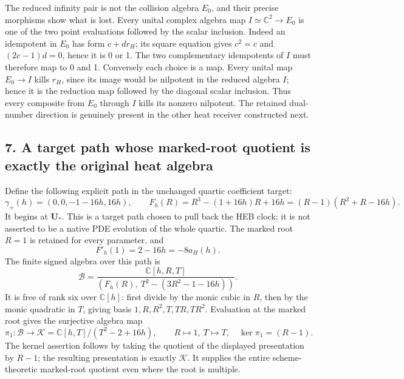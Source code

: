 \documentclass[
  10pt,
  a4paper,
]{article}
\begin{document}
The reduced infinity pair is not the collision algebra \(E_0\), and
their precise morphisms show what is lost. Every unital complex algebra
map \(I\simeq\mathbb C^2\to E_0\) is one of the two point evaluations
followed by the scalar inclusion. Indeed an idempotent in \(E_0\) has
form \(c+dr_H\); its square equation gives \(c^2=c\) and \((2c-1)d=0\),
hence it is 0 or 1. The two complementary idempotents of \(I\) must
therefore map to 0 and 1. Conversely each choice is a map. Every unital
map \(E_0\to I\) kills \(r_H\), since its image would be nilpotent in
the reduced algebra \(I\); hence it is the reduction map followed by the
diagonal scalar inclusion. Thus every composite from \(E_0\) through
\(I\) kills its nonzero nilpotent. The retained dual-number direction is
genuinely present in the other heat receiver constructed next.

\subsection{7. A target path whose marked-root quotient is exactly the
original heat
algebra}\label{a-target-path-whose-marked-root-quotient-is-exactly-the-original-heat-algebra}

Define the following explicit path in the unchanged quartic coefficient
target: \[
\gamma_+(h)=(0,0,-1-16h,16h),\qquad
F_h(R)=R^3-(1+16h)R+16h
=(R-1)(R^2+R-16h).
\tag{ESH35}
\] It begins at \(\mathbf U_*\). This is a target path chosen to pull
back the HEB clock; it is not asserted to be a native PDE evolution of
the whole quartic. The marked root \(R=1\) is retained for every
parameter, and \[
F'_h(1)=2-16h=-8a_H(h).
\tag{ESH36}
\] The finite signed algebra over this path is \[
\mathcal B=
\frac{\mathbb C[h,R,T]}{(F_h(R),\ T^2-(3R^2-1-16h))}.
\tag{ESH37}
\] It is free of rank six over \(\mathbb C[h]\): first divide by the
monic cubic in \(R\), then by the monic quadratic in \(T\), giving basis
\(1,R,R^2,T,TR,TR^2\). Evaluation at the marked root gives the
surjective algebra map \[
\pi_1:\mathcal B\longrightarrow
\mathcal K=\mathbb C[h,T]/(T^2-2+16h),
\qquad R\longmapsto1,\ T\longmapsto T,
\quad\ker\pi_1=(R-1).
\tag{ESH38}
\] The kernel assertion follows by taking the quotient of the displayed
presentation by \(R-1\); the resulting presentation is exactly
\(\mathcal K\). It supplies the entire scheme-theoretic marked-root
quotient even where the root is multiple.
\end{document}

